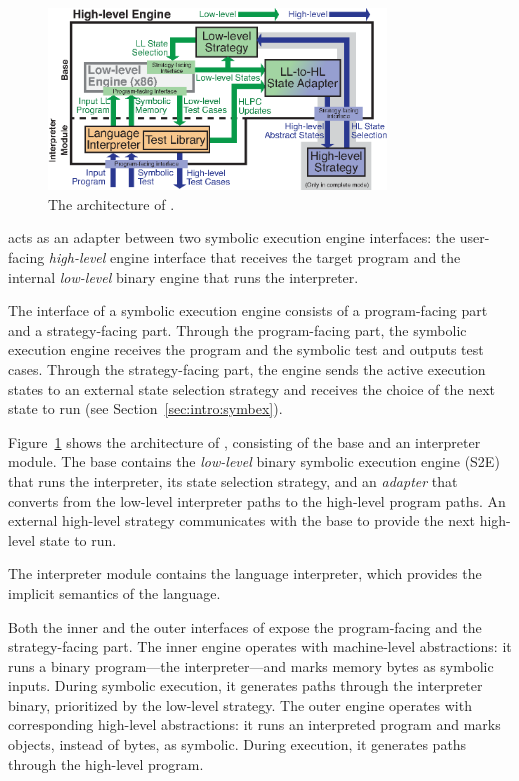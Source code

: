 \begin{figure}
  \centering
  \includegraphics[width=0.8\textwidth]{chef/figures/iface-adapter}
  \caption{The architecture of \chef.}
  \label{fig:chef:arch}
\end{figure}

\chef acts as an adapter between two symbolic execution engine interfaces:
%
the user-facing \emph{high-level} engine interface that receives the target program and the internal \emph{low-level} binary engine that runs the interpreter.

The interface of a symbolic execution engine consists of a program-facing part and a strategy-facing part.
%
Through the program-facing part, the symbolic execution engine receives the program and the symbolic test and outputs test cases.
%
Through the strategy-facing part, the engine sends the active execution states to an external state selection strategy and receives the choice of the next state to run (see Section~\ref{sec:intro:symbex}).


Figure~\ref{fig:chef:arch} shows the architecture of \chef, consisting of the base and an interpreter module.
%
The base contains the \emph{low-level} binary symbolic execution engine (S2E) that runs the interpreter, its state selection strategy, and an \emph{adapter} that converts from the low-level interpreter paths to the high-level program paths.
%
An external high-level strategy communicates with the base to provide the next high-level state to run.

The interpreter module contains the language interpreter, which provides the implicit semantics of the language.

Both the inner and the outer interfaces of \chef expose the program-facing and the strategy-facing part.
%
The inner engine operates with machine-level abstractions: it runs a binary program---the interpreter---and marks memory bytes as symbolic inputs.  During symbolic execution, it generates paths through the interpreter binary, prioritized by the low-level strategy.
%
The outer engine operates with corresponding high-level abstractions: it runs an interpreted program and marks objects, instead of bytes, as symbolic.  During execution, it generates paths through the high-level program.

